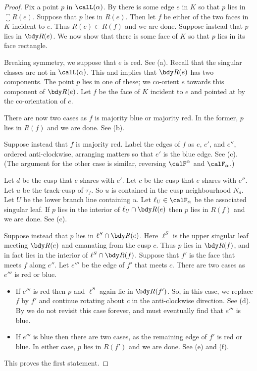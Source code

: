 \documentclass[12pt]{amsart}
\begin{document}
\begin{proof}
Fix a point $p$ in $\calL(\alpha)$.  By  there is some edge $e$ in $K$ so that $p$ lies in $\closure{R}(e)$.  Suppose that $p$ lies in $R(e)$.  Then let $f$ be either of the two faces in $K$ incident to $e$.  Thus $R(e) \subset R(f)$ and we are done.  Suppose instead that $p$ lies in $\bdy R(e)$.  We now show that there is some face of $K$ so that $p$ lies in its face rectangle. 

Breaking symmetry, we suppose that $e$ is red.  See (a).  Recall that the singular classes are not in $\calL(\alpha)$.  This and  implies that $\bdy R(e)$ has two components.  The point $p$ lies in one of these; we co-orient $e$ towards this component of $\bdy R(e)$.  Let $f$ be the face of $K$ incident to $e$ and pointed at by the co-orientation of $e$. 

There are now two cases as $f$ is majority blue or majority red.   In the former, $p$ lies in $R(f)$ and we are done.  See (b). 

Suppose instead that $f$ is majority red.  Label the edges of $f$ as $e$, $e'$, and $e''$, ordered anti-clockwise, arranging matters so that $e'$ is the blue edge.  See (c).  (The argument for the other case is similar, reversing $\calF^\alpha$ and $\calF_\alpha$.) 

Let $d$ be the cusp that $e$ shares with $e'$.  Let $c$ be the cusp that $e$ shares with $e''$.  Let $u$ be the track-cusp of $\tau_f$.  So $u$ is contained in the cusp neighbourhood $N_d$.  Let $U$ be the lower branch line containing $u$.  Let $\ell_U \in \calF_\alpha$ be the associated singular leaf.  If $p$ lies in the interior of $\ell_U \cap \bdy R(e)$ then $p$ lies in $R(f)$ and we are done.  See (c). 

Suppose instead that $p$ lies in $\ell^S \cap \bdy R(e)$.  Here $\ell^S$ is the upper singular leaf meeting $\bdy R(e)$ and emanating from the cusp $c$.  Thus $p$ lies in $\bdy R(f)$, and in fact lies in the interior of $\ell^S \cap \bdy R(f)$.  Suppose that $f'$ is the face that meets $f$ along $e''$.  Let $e'''$ be the edge of $f'$ that meets $c$.  There are two cases as $e'''$ is red or blue.
\begin{itemize}
\item
If $e'''$ is red then $p$ and $\ell^S$ again lie in $\bdy R(f')$.  So, in this case, we replace $f$ by $f'$ and continue rotating about $c$ in the anti-clockwise direction. See (d). By  we do not revisit this case forever, and must eventually find that $e'''$ is blue.
\item
If $e'''$ is blue then there are two cases, as the remaining edge of $f'$ is red or blue. In either case, $p$ lies in $R(f')$ and we are done. See (e) and (f). 
\end{itemize}
This proves the first statement.


\end{proof}
\end{document}
